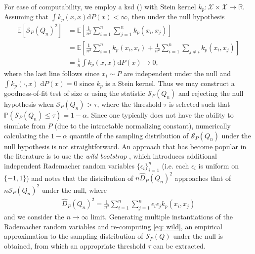 \documentclass[12pt,paper=letter]{scrreprt}
\begin{document}
For ease of computability, we employ a \acf{ksd} () with Stein kernel $k_p : \mathcal{X} \times \mathcal{X} \rightarrow \mathbb{R}$.
Assuming that $\int k_p(x,x) \mathrm{d}P(x) < \infty$, then under the null hypothesis
\begin{align*}
\mathbb{E}\left[ \mathcal{S}_P(Q_n)^2 \right] & = \mathbb{E}\left[ \frac{1}{n^2} \sum_{i=1}^n \sum_{j=1}^n k_p(x_i,x_j) \right]  \\
& = \mathbb{E}\left[ \frac{1}{n^2} \sum_{i=1}^n k_p(x_i,x_i) + \frac{1}{n^2} \sum_{i = 1}^n \sum_{j \neq i} k_p(x_i,x_j) \right] \\
& = \frac{1}{n} \int k_p(x,x) \mathrm{d}P(x) \rightarrow 0,
\end{align*}
where the last line follows since $x_i \sim P$ are independent under the null and $\int k_p(\cdot,x) \; \mathrm{d}P(x) = 0$ since $k_p$ is a Stein kernel.
Thus we may construct a goodness-of-fit test of size $\alpha$ using the statistic $\mathcal{S}_P(Q_n)$ and rejecting the null hypothesis when $\mathcal{S}_P(Q_n) > \tau$, where the threshold $\tau$ is selected such that $\mathbb{P}(\mathcal{S}_P(Q_n) \leq \tau) = 1 - \alpha$.
Since one typically does not have the ability to simulate from $P$ (due to the intractable normalizing constant), numerically calculating the $1 - \alpha$ quantile of the sampling distribution of $\mathcal{S}_P(Q_n)$ under the null hypothesis is not straightforward.
An approach that has become popular in the literature \citep{liu2016kernelized,chwialkowski2016kernel} is to use the \emph{wild bootstrap} \citep{shao2010dependent,fromont2012kernels,leucht2013dependent}, which introduces additional independent Rademacher random variables $\{\epsilon_i\}_{i=1}^n$ (i.e. each $\epsilon_i$ is uniform on $\{-1,1\}$) and notes that the distribution of $n \hat{D}_P(Q_n)^2$ approaches that of $n\mathcal{S}_P(Q_n)^2$ under the null, where
\begin{align}
    \hat{D}_P(Q_n)^2 = \frac{1}{n^2} \sum_{i=1}^n \sum_{j=1}^n \epsilon_i \epsilon_j k_p(x_i,x_j)  \label{eq: wild}
\end{align}
and we consider the $n \rightarrow \infty$ limit.
Generating multiple instantiations of the Rademacher random variables and re-computing \eqref{eq: wild}, an empirical approximation to the sampling distribution of $\mathcal{S}_P(Q)$ under the null is obtained, from which an appropriate threshold $\tau$ can be extracted.
\end{document}
